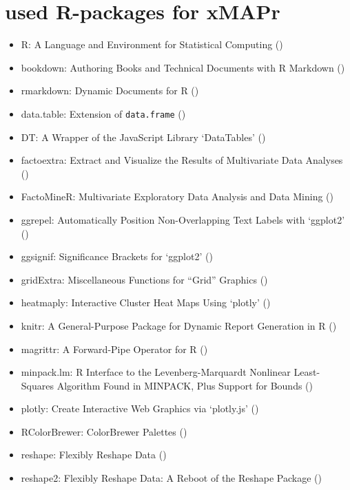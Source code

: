 \documentclass[
]{book}
\providecommand{\tightlist}{%
  \setlength{\itemsep}{0pt}\setlength{\parskip}{0pt}}
\begin{document}
\hypertarget{used-r-packages-for-xmapr}{%
\chapter{used R-packages for xMAPr}\label{used-r-packages-for-xmapr}}

\begin{itemize}
\tightlist
\item
  R: A Language and Environment for Statistical Computing (\citet{R-base})
\item
  bookdown: Authoring Books and Technical Documents with R Markdown (\citet{R-bookdown})
\item
  rmarkdown: Dynamic Documents for R (\citet{R-rmarkdown})
\item
  data.table: Extension of \texttt{data.frame} (\citet{R-data.table})
\item
  DT: A Wrapper of the JavaScript Library `DataTables' (\citet{R-DT})
\item
  factoextra: Extract and Visualize the Results of Multivariate Data Analyses (\citet{R-factoextra})
\item
  FactoMineR: Multivariate Exploratory Data Analysis and Data Mining (\citet{R-FactoMineR})
\item
  ggrepel: Automatically Position Non-Overlapping Text Labels with `ggplot2' (\citet{R-ggrepel})
\item
  ggsignif: Significance Brackets for `ggplot2' (\citet{R-ggsignif})
\item
  gridExtra: Miscellaneous Functions for ``Grid'' Graphics (\citet{R-gridExtra})
\item
  heatmaply: Interactive Cluster Heat Maps Using `plotly' (\citet{R-heatmaply})
\item
  knitr: A General-Purpose Package for Dynamic Report Generation in R (\citet{R-knitr})
\item
  magrittr: A Forward-Pipe Operator for R (\citet{R-magrittr})
\item
  minpack.lm: R Interface to the Levenberg-Marquardt Nonlinear Least-Squares Algorithm Found in MINPACK, Plus Support for Bounds (\citet{R-minpack.lm})
\item
  plotly: Create Interactive Web Graphics via `plotly.js' (\citet{R-plotly})
\item
  RColorBrewer: ColorBrewer Palettes (\citet{R-RColorBrewer})
\item
  reshape: Flexibly Reshape Data (\citet{R-reshape})
\item
  reshape2: Flexibly Reshape Data: A Reboot of the Reshape Package (\citet{R-reshape2})

\end{itemize}
\end{document}
